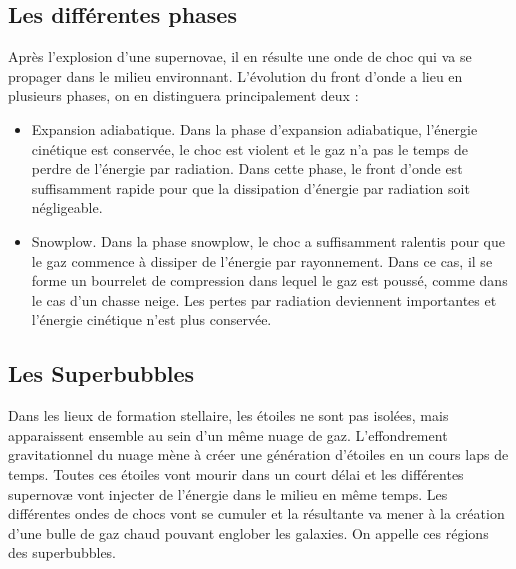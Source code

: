 

\subsection{Les différentes phases}
Après l'explosion d'une supernovae, il en résulte une onde de choc qui va se propager dans le milieu environnant.
L'évolution du front d'onde a lieu en plusieurs phases, on en distinguera principalement deux : 

\begin{itemize}
\item Expansion adiabatique.
Dans la phase d'expansion adiabatique, l'énergie cinétique est conservée, le choc est violent et le gaz n'a pas le temps de perdre de l'énergie par radiation.
Dans cette phase, le front d'onde est suffisamment rapide pour que la dissipation d'énergie par radiation soit négligeable.

\item Snowplow.
Dans la phase snowplow, le choc a suffisamment ralentis pour que le gaz commence à dissiper de l'énergie par rayonnement.
Dans ce cas, il se forme un bourrelet de compression dans lequel le gaz est poussé, comme dans le cas d'un chasse neige. 
Les pertes par radiation deviennent importantes et l'énergie cinétique n'est plus conservée.
\end{itemize}

\subsection{Les Superbubbles}

Dans les lieux de formation stellaire, les étoiles ne sont pas isolées, mais apparaissent ensemble au sein d'un même nuage de gaz.
L'effondrement gravitationnel du nuage mène à créer une génération d’étoiles en un cours laps de temps.
Toutes ces étoiles vont mourir dans un court délai et les différentes supernovæ vont injecter de l’énergie dans le milieu en même temps.
Les différentes ondes de chocs vont se cumuler et la résultante va mener à la création d'une bulle de gaz chaud pouvant englober les galaxies.
On appelle ces régions des superbubbles.


